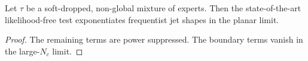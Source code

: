 \begin{theorem}\label{thm:2}
Let $\tau$ be a soft-dropped, non-global mixture of experts. Then the
state-of-the-art likelihood-free test exponentiates frequentist jet
shapes in the planar limit.
\end{theorem}

\begin{proof}
The remaining terms are power suppressed. The boundary terms vanish in
the large-$N_c$ limit.
\end{proof}

